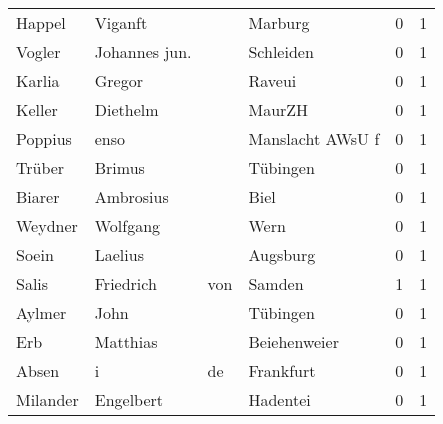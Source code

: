 \begin{tabular}{llllrr}
                   Happel &                            Viganft &             &                                     Marburg &          0 &         1 \\
                   Vogler &                      Johannes jun. &             &                                   Schleiden &          0 &         1 \\
                   Karlia &                             Gregor &             &                                      Raveui &          0 &         1 \\
                   Keller &                           Diethelm &             &                                      MaurZH &          0 &         1 \\
                  Poppius &                               enso &             &                            Manslacht AWsU f &          0 &         1 \\
                   Trüber &                             Brimus &             &                                    Tübingen &          0 &         1 \\
                   Biarer &                          Ambrosius &             &                                        Biel &          0 &         1 \\
                  Weydner &                           Wolfgang &             &                                        Wern &          0 &         1 \\
                    Soein &                            Laelius &             &                                    Augsburg &          0 &         1 \\
                    Salis &                          Friedrich &         von &                                      Samden &          1 &         1 \\
                   Aylmer &                               John &             &                                    Tübingen &          0 &         1 \\
                      Erb &                           Matthias &             &                                Beiehenweier &          0 &         1 \\
                    Absen &                                  i &          de &                                   Frankfurt &          0 &         1 \\
                 Milander &                          Engelbert &             &                                    Hadentei &          0 &         1 \\

\end{tabular}
